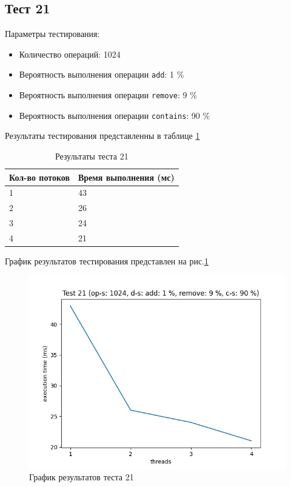 \subsection*{Тест 21}

Параметры тестирования:

\begin{itemize}
    \item Количество операций: 1024
    \item Вероятность выполнения операции \verb|add|: 1 \%
    \item Вероятность выполнения операции \verb|remove|: 9 \%
    \item Вероятность выполнения операции \verb|contains|: 90 \%
\end{itemize}

Результаты тестирования представленны в таблице \ref{tab:results21}


\begin{table}[H]
    \centering
    \begin{tabular}{|l|l|}
        \hline
        Кол-во потоков & Время выполнения (мс) \\
        \hline
        1 & 43 \\
        \hline
        2 & 26 \\
        \hline
        3 & 24 \\
        \hline
        4 & 21 \\
        \hline
    \end{tabular}
    \caption{Результаты теста 21}
    \label{tab:results21}
\end{table}
        

График результатов тестирования представлен на рис.\ref{fig:plot21}

\begin{figure}[H]
    \centering
    \includegraphics[width=0.7\linewidth]{photo/plot21}
    \caption{График результатов теста 21}
    \label{fig:plot21}
\end{figure}

